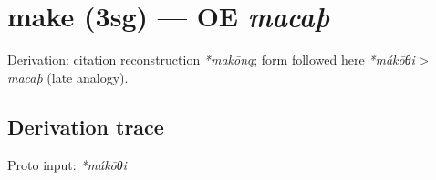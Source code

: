 \documentclass[
  british,
  a4paper,
  openany]{book}
\providecommand{\texorpdfstring}[2]{#1}
\begin{document}
\section{\texorpdfstring{make (3sg) --- OE
\emph{macaþ}}{make (3sg) --- OE macaþ}}\label{make-3sg-oe-macauxfe}


Derivation: citation reconstruction \emph{*makōną}; form followed here
\emph{*mákōθi} \textgreater{} \emph{macaþ} (late analogy).

\subsection{Derivation trace}\label{derivation-trace-127}

Proto input: \emph{*mákōθi}

\begingroup
\setlength{\fboxsep}{6pt}
\end{document}

